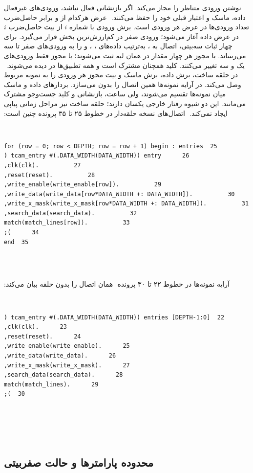 ‫نوشتن ورودی متناظر را مجاز می‌کند. اگر بازنشانی فعال نباشد، ورودی‌های غیرفعال داده،
‫ماسک و اعتبار قبلی خود را حفظ می‌کنند.
‫
‫عرض هرکدام از  و  برابر حاصل‌ضرب تعداد ورودی‌ها در عرض هر ورودی است. برش ورودی با شماره $i$ از بیت حاصل‌ضرب $i$ در عرض داده آغاز می‌شود؛ ورودی صفر در کم‌ارزش‌ترین بخش قرار می‌گیرد. برای چهار ثبات سه‌بیتی، اتصال  به ، به‌ترتیب داده‌های ، ،  و  را به ورودی‌های صفر تا سه می‌رساند. با مجوز  هر چهار مقدار در همان لبه ثبت می‌شوند؛ با مجوز  فقط ورودی‌های یک و سه تغییر می‌کنند. کلید  همچنان مشترک است و همه تطبیق‌ها در  دیده می‌شوند.
‫
‫در  حلقه ساخت، برش داده، برش ماسک و بیت مجوز هر ورودی را به نمونه مربوط وصل می‌کند. در  آرایه نمونه‌ها همین اتصال را بدون  می‌سازد. بردارهای داده و ماسک میان نمونه‌ها تقسیم می‌شوند، ولی ساعت، بازنشانی و کلید جست‌وجو مشترک می‌مانند. این دو شیوه رفتار خارجی یکسان دارند؛ حلقه ساخت نیز مراحل زمانی پیاپی ایجاد نمی‌کند.
‫
‫اتصال‌های نسخه حلقه‌دار در خطوط ۲۵ تا ۳۵ پرونده  چنین است:
‫
‫\begin{dsdlcodeblock}
‫\begin{verbatim}
‫25  for (row = 0; row < DEPTH; row = row + 1) begin : entries
‫26      tcam_entry #(.DATA_WIDTH(DATA_WIDTH)) entry (
‫27          .clk(clk),
‫28          .reset(reset),
‫29          .write_enable(write_enable[row]),
‫30          .write_data(write_data[row*DATA_WIDTH +: DATA_WIDTH]),
‫31          .write_x_mask(write_x_mask[row*DATA_WIDTH +: DATA_WIDTH]),
‫32          .search_data(search_data),
‫33          .match(match_lines[row])
‫34      );
‫35  end
‫\end{verbatim}
‫\end{dsdlcodeblock}
‫
‫آرایه نمونه‌ها در خطوط ۲۲ تا ۳۰ پرونده
‫ همان اتصال را بدون حلقه بیان می‌کند:
‫
‫\begin{dsdlcodeblock}
‫\begin{verbatim}
‫22  tcam_entry #(.DATA_WIDTH(DATA_WIDTH)) entries [DEPTH-1:0] (
‫23      .clk(clk),
‫24      .reset(reset),
‫25      .write_enable(write_enable),
‫26      .write_data(write_data),
‫27      .write_x_mask(write_x_mask),
‫28      .search_data(search_data),
‫29      .match(match_lines)
‫30  );
‫\end{verbatim}
‫\end{dsdlcodeblock}
‫
‫\subsection{محدوده پارامترها و حالت صفر‌بیتی}
